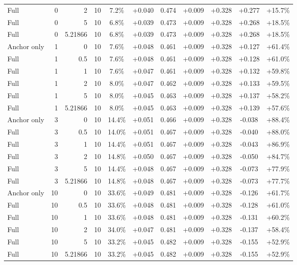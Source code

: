 \begin{table}[htbp]
\begin{tabular}{lrrrccccccc}
Full & 0 & 2 & 10 & 7.2\% & +0.040 & 0.474 & +0.009 & +0.328 & +0.277 & +15.7\% \\
Full & 0 & 5 & 10 & 6.8\% & +0.039 & 0.473 & +0.009 & +0.328 & +0.268 & +18.5\% \\
Full & 0 & 5.21866 & 10 & 6.8\% & +0.039 & 0.473 & +0.009 & +0.328 & +0.268 & +18.5\% \\
Anchor only & 1 & 0 & 10 & 7.6\% & +0.048 & 0.461 & +0.009 & +0.328 & +0.127 & +61.4\% \\
Full & 1 & 0.5 & 10 & 7.6\% & +0.048 & 0.461 & +0.009 & +0.328 & +0.128 & +61.0\% \\
Full & 1 & 1 & 10 & 7.6\% & +0.047 & 0.461 & +0.009 & +0.328 & +0.132 & +59.8\% \\
Full & 1 & 2 & 10 & 8.0\% & +0.047 & 0.462 & +0.009 & +0.328 & +0.133 & +59.5\% \\
Full & 1 & 5 & 10 & 8.0\% & +0.045 & 0.463 & +0.009 & +0.328 & +0.137 & +58.2\% \\
Full & 1 & 5.21866 & 10 & 8.0\% & +0.045 & 0.463 & +0.009 & +0.328 & +0.139 & +57.6\% \\
Anchor only & 3 & 0 & 10 & 14.4\% & +0.051 & 0.466 & +0.009 & +0.328 & -0.038 & +88.4\% \\
Full & 3 & 0.5 & 10 & 14.0\% & +0.051 & 0.467 & +0.009 & +0.328 & -0.040 & +88.0\% \\
Full & 3 & 1 & 10 & 14.4\% & +0.051 & 0.467 & +0.009 & +0.328 & -0.043 & +86.9\% \\
Full & 3 & 2 & 10 & 14.8\% & +0.050 & 0.467 & +0.009 & +0.328 & -0.050 & +84.7\% \\
Full & 3 & 5 & 10 & 14.4\% & +0.048 & 0.467 & +0.009 & +0.328 & -0.073 & +77.9\% \\
Full & 3 & 5.21866 & 10 & 14.8\% & +0.048 & 0.467 & +0.009 & +0.328 & -0.073 & +77.7\% \\
Anchor only & 10 & 0 & 10 & 33.6\% & +0.049 & 0.481 & +0.009 & +0.328 & -0.126 & +61.7\% \\
Full & 10 & 0.5 & 10 & 33.6\% & +0.048 & 0.481 & +0.009 & +0.328 & -0.128 & +61.0\% \\
Full & 10 & 1 & 10 & 33.6\% & +0.048 & 0.481 & +0.009 & +0.328 & -0.131 & +60.2\% \\
Full & 10 & 2 & 10 & 34.0\% & +0.047 & 0.481 & +0.009 & +0.328 & -0.137 & +58.4\% \\
Full & 10 & 5 & 10 & 33.2\% & +0.045 & 0.482 & +0.009 & +0.328 & -0.155 & +52.9\% \\
Full & 10 & 5.21866 & 10 & 33.2\% & +0.045 & 0.482 & +0.009 & +0.328 & -0.155 & +52.9\% \\

\end{tabular}
\end{table}
